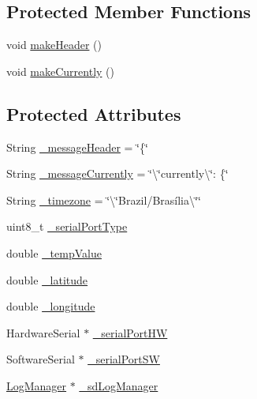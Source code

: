 \subsection*{Protected Member Functions}
\begin{DoxyCompactItemize}
\item 
void \hyperlink{class_print_manager_abe73e179fbf7817ac2501663086efa6a}{make\+Header} ()
\item 
void \hyperlink{class_print_manager_aefa604ff2567aefd703c584cf530f581}{make\+Currently} ()
\end{DoxyCompactItemize}
\subsection*{Protected Attributes}
\begin{DoxyCompactItemize}
\item 
String \hyperlink{class_print_manager_a352c21440d4b8da910822603bbc6439d}{\+\_\+message\+Header} = \char`\"{}\{\char`\"{}
\item 
String \hyperlink{class_print_manager_a45a45bb347196bab8c3071cc5de6631a}{\+\_\+message\+Currently} = \char`\"{}\textbackslash{}\char`\"{}currently\textbackslash{}\char`\"{}\+: \{\char`\"{}
\item 
String \hyperlink{class_print_manager_ac499e04d25e84c7d7841d24c38a3bd47}{\+\_\+timezone} = \char`\"{}\textbackslash{}\char`\"{}Brazil/Brasília\textbackslash{}\char`\"{}\char`\"{}
\item 
uint8\+\_\+t \hyperlink{class_print_manager_ae1b8f767b738748027e0ac2a97f1be6c}{\+\_\+serial\+Port\+Type}
\item 
double \hyperlink{class_print_manager_a550ad6ba340af9c4f689b8e25bd420f3}{\+\_\+temp\+Value}
\item 
double \hyperlink{class_print_manager_a722d74baa1b0286c84b6d5181996ba2e}{\+\_\+latitude}
\item 
double \hyperlink{class_print_manager_a31a2a77dba86f3d99af5c6bd1d2baa4c}{\+\_\+longitude}
\item 
Hardware\+Serial $\ast$ \hyperlink{class_print_manager_a19cd58c07357e6142b92ed4598cda1bc}{\+\_\+serial\+Port\+HW}
\item 
Software\+Serial $\ast$ \hyperlink{class_print_manager_aa079f14838d51ffd18ac814323c3d177}{\+\_\+serial\+Port\+SW}
\item 
\hyperlink{class_log_manager}{Log\+Manager} $\ast$ \hyperlink{class_print_manager_a76f3172298d67da7428e55b2515aa030}{\+\_\+sd\+Log\+Manager}
\end{DoxyCompactItemize}


